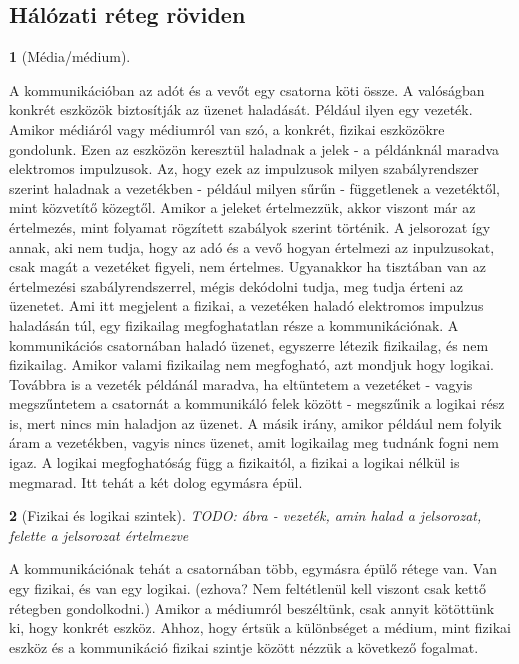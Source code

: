 \documentclass[a4paper, 12pt, oneside]{article}
\newtheorem*{defin}{}
\begin{document}
\subsection*{Hálózati réteg röviden}

\begin{center}
\begin{defin}[Média/médium]
\end{defin}
\end{center}

A kommunikációban az adót és a vevőt egy csatorna köti össze. A valóságban konkrét eszközök biztosítják az üzenet haladását. Például ilyen egy vezeték. Amikor médiáról vagy médiumról van szó, a konkrét, fizikai eszközökre gondolunk. Ezen az eszközön keresztül haladnak a jelek - a példánknál maradva elektromos impulzusok. Az, hogy ezek az impulzusok milyen szabályrendszer szerint haladnak a vezetékben - például milyen sűrűn - függetlenek a vezetéktől, mint közvetítő közegtől. Amikor a jeleket értelmezzük, akkor viszont már az értelmezés, mint folyamat rögzített szabályok szerint történik. A jelsorozat így annak, aki nem tudja, hogy az adó és a vevő hogyan értelmezi az inpulzusokat, csak magát a vezetéket figyeli, nem értelmes. Ugyanakkor ha tisztában van az értelmezési szabályrendszerrel, mégis dekódolni tudja, meg tudja érteni az üzenetet. 
\bigbreak
Ami itt megjelent a fizikai, a vezetéken haladó elektromos impulzus haladásán túl, egy fizikailag megfoghatatlan része a kommunikációnak. A kommunikációs csatornában haladó üzenet, egyszerre létezik fizikailag, és nem fizikailag. Amikor valami fizikailag nem megfogható, azt mondjuk hogy logikai. Továbbra is a vezeték példánál maradva, ha eltüntetem a vezetéket - vagyis megszűntetem a csatornát a kommunikáló felek között - megszűnik a logikai rész is, mert nincs min haladjon az üzenet. A másik irány, amikor például nem folyik áram a vezetékben, vagyis nincs üzenet, amit logikailag meg tudnánk fogni nem igaz. A logikai megfoghatóság függ a fizikaitól, a fizikai a logikai nélkül is megmarad. Itt tehát a két dolog egymásra épül.

\begin{center}
\begin{defin}[Fizikai és logikai szintek]
TODO: ábra - vezeték, amin halad a jelsorozat, felette a jelsorozat értelmezve
\end{defin}
\end{center}

A kommunikációnak tehát a csatornában több, egymásra épülő rétege van. Van egy fizikai, és van egy logikai. (ezhova? Nem feltétlenül kell viszont csak kettő rétegben gondolkodni.) Amikor a médiumról beszéltünk, csak annyit kötöttünk ki, hogy konkrét eszköz. Ahhoz, hogy értsük a különbséget a médium, mint fizikai eszköz és a kommunikáció fizikai szintje között nézzük a következő fogalmat.
\end{document}
